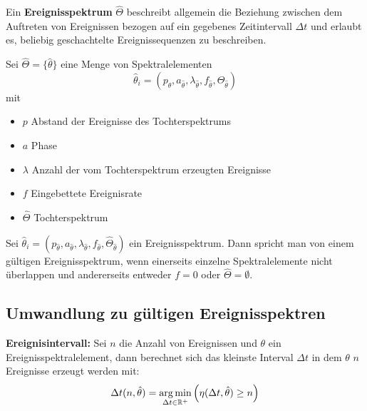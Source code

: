 \begin{tcolorbox}
    Ein \textbf{Ereignisspektrum} $\hat{\Theta}$ beschreibt allgemein die Beziehung
    zwischen dem Auftreten von Ereignissen bezogen auf ein gegebenes Zeitintervall
    $\Delta t$ und erlaubt es, beliebig geschachtelte Ereignissequenzen zu beschreiben.
    
    Sei $\hat{\Theta} = \{\hat{\theta}\}$ eine Menge von Spektralelementen
    \begin{equation}
        \hat{\theta}_i = \left(p_{\hat{\theta}}, a_{\hat{\theta}}, 
            \lambda_{\hat{\theta}}, f_{\hat{\theta}}, \hat{\Theta}_{\hat{\theta}}
            \right) 
    \end{equation}
    mit
    \begin{itemize}
        \item $p$ Abstand der Ereignisse des Tochterspektrums
        \item $a$ Phase
        \item $\lambda$ Anzahl der vom Tochterspektrum erzeugten Ereignisse
        \item $f$ Eingebettete Ereignisrate
        \item $\hat{\Theta}$ Tochterspektrum
    \end{itemize}
\end{tcolorbox}

\begin{tcolorbox}
    Sei $\hat{\theta}_i = \left(p_{\hat{\theta}}, a_{\hat{\theta}}, \lambda_{\hat{\theta}}, f_{\hat{\theta}}, \hat{\Theta}_{\hat{\theta}}\right)$
    ein Ereignisspektrum. Dann spricht man von einem gültigen Ereignisspektrum,
    wenn einerseits einzelne Spektralelemente nicht überlappen und andererseits
    entweder $f=0$ oder $\hat{\Theta} = \emptyset$.
\end{tcolorbox}

\subsection{Umwandlung zu gültigen Ereignisspektren}
\begin{tcolorbox}
    \textbf{Ereignisintervall: } Sei $n$ die Anzahl von Ereignissen und $\theta$ ein
    Ereignisspektralelement, dann berechnet sich das kleinste Interval $\Delta t$ in
    dem $\theta$ $n$ Ereignisse erzeugt werden mit:
    \begin{equation}
        \Delta t(n, \hat{\theta}) = \operatorname*{arg\,min}_{\Delta t \in \mathbb{R}^+}\left(
            \eta(\Delta t, \hat{\theta}) \geq n\right)
    \end{equation}
\end{tcolorbox}

